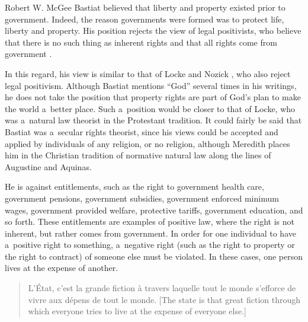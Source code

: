 \begin{artengenv}{Robert W. McGee}
Bastiat believed that liberty and property existed prior to government. Indeed, the reason governments were formed was to protect life, liberty and property. His position rejects the view of legal positivists, who believe that there is no such thing as inherent rights and that all rights come from government 
\parencites[][]{bentham_anarchical_1843}[][]{austin_lectures_1869}[][]{fuller_morality_1969}[][]{kramer_defense_1999}[][]{marmor_positive_2001}[][]{waldron_nonsense_1987}.%




In this regard, his view is similar to that of Locke 
\parencite*[][]{locke_two_1689} %
 and Nozick 
\parencite*[][]{nozick_anarchy_1974}, %
 who also reject legal positivism. Although Bastiat mentions ``God'' several times in his writings, he does not take the position that property rights are part of God's plan to make the world a~better place. Such a~position would be closer to that of Locke, who was a~natural law theorist in the Protestant tradition. It could fairly be said that Bastiat was a~secular rights theorist, since his views could be accepted and applied by individuals of any religion, or no religion, although Meredith 
\parencite*[][]{meredith_taxation_2009} %
 places him in the Christian tradition of normative natural law along the lines of Augustine and Aquinas.



He is against entitlements, such as the right to government health care, government pensions, government subsidies, government enforced minimum wages, government provided welfare, protective tariffs, government education, and so forth. These entitlements are examples of positive law, where the right is not inherent, but rather comes from government. In order for one individual to have a~positive right to something, a~negative right (such as the right to property or the right to contract) of someone else must be violated. In these cases, one person lives at the expense of another.



\begin{quote}
L'État, c'est la grande fiction à travers laquelle tout le monde s'efforce de vivre aux dépens de tout le monde. 
\parencite[][p.332]{bastiat_ce_1873} %
 [The state is that great fiction through which everyone tries to live at the expense of everyone else.]
\end{quote}




\end{artengenv}
